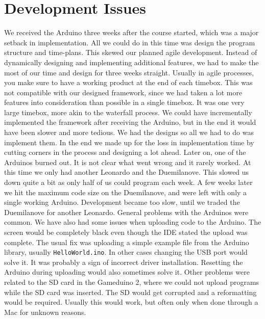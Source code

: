 \section{Development Issues} %
We received the Arduino three weeks after the course started, which was a major setback in implementation. All we could do in this time was design the program structure and time-plans. This skewed our planned agile development. Instead of dynamically designing and implementing additional features, we had to make the most of our time and design for three weeks straight. Usually in agile processes, you make sure to have a working product at the end of each timebox. This was not compatible with our designed framework, since we had taken a lot more features into consideration than possible in a single timebox. It was one very large timebox, more akin to the waterfall process. We could have incrementally implemented the framework after receiving the Arduino, but in the end it would have been slower and more tedious. We had the designs so all we had to do was implement them. In the end we made up for the loss in implementation time by cutting corners in the process and designing a lot ahead.
\newline
Later on, one of the Arduinos burned out. It is not clear what went wrong and it rarely worked. At this time we only had another Leonardo and the Duemilanove. This slowed us down quite a bit as only half of us could program each week. A few weeks later we hit the maximum code size on the Duemilanove, and were left with only a single working Arduino. Development became too slow, until we traded the Duemilanove for another Leonardo.
\newline
General problems with the Arduinos were common. We have also had some issues when uploading code to the Arduino. The screen would be completely black even though the IDE stated the upload was complete. The usual fix was uploading a simple example file from the Arduino library, usually {\tt HelloWorld.ino}. In other cases changing the USB port would solve it. It was probably a sign of incorrect driver installation. Resetting the Arduino during uploading would also sometimes solve it. Other problems were related to the SD card in the Gameduino 2, where we could not upload programs while the SD card was inserted. The SD would get corrupted and a reformatting would be required. Usually this would work, but often only when done through a Mac for unknown reasons.
